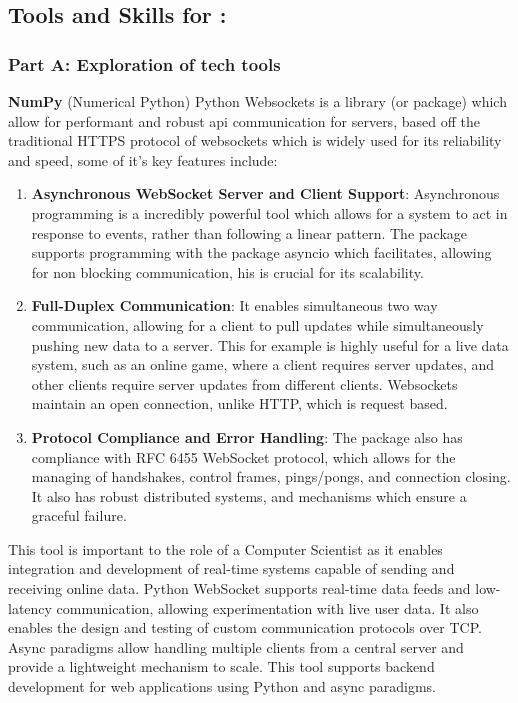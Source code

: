 \documentclass[a4paper, 11pt]{report}
\begin{document}
\subsection{Tools and Skills for \majA: \studA}

\subsubsection{Part A: Exploration of tech tools}

\textbf{NumPy} (Numerical Python) Python Websockets is a library (or package) which allow for performant and robust api communication for servers, based off the traditional HTTPS protocol of websockets which is widely used for its reliability and speed, some of it’s key features include:

\begin{enumerate}
    \item \textbf{Asynchronous WebSocket Server and Client Support}: Asynchronous programming is a incredibly powerful tool which allows for a system to act in response to events, rather than following a linear pattern. The package supports programming with the package asyncio which facilitates, allowing for non blocking communication, his is crucial for its scalability.
    \item \textbf{Full-Duplex Communication}: It enables simultaneous two way communication, allowing for a client to pull updates while simultaneously pushing new data to a server. This for example is highly useful for a live data system, such as an online game, where a client requires server updates, and other clients require server updates from different clients. Websockets maintain an open connection, unlike HTTP, which is request based.
    \item \textbf{Protocol Compliance and Error Handling}: The package also has compliance with RFC 6455 WebSocket protocol, which allows for the managing of handshakes, control frames, pings/pongs, and connection closing. It also has robust distributed systems, and mechanisms which ensure a graceful failure.
\end{enumerate}

This tool is important to the role of a Computer Scientist as it enables integration and development of real-time systems capable of sending and receiving online data. Python WebSocket supports real-time data feeds and low-latency communication, allowing experimentation with live user data. It also enables the design and testing of custom communication protocols over TCP. Async paradigms allow handling multiple clients from a central server and provide a lightweight mechanism to scale. This tool supports backend development for web applications using Python and async paradigms.
\end{document}

